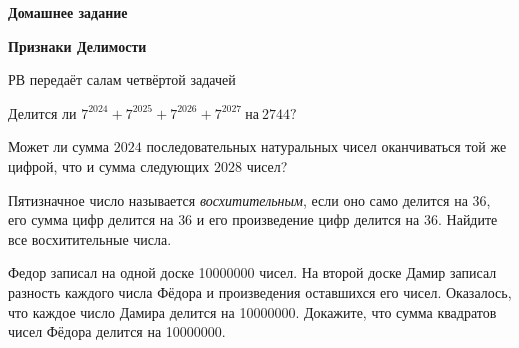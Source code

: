 \hspace{3mm}

\centerline{\bf \Huge Домашнее задание}
\centerline{\bf \Huge Признаки Делимости}

\begin{flushright}
    \scriptsize{РВ передаёт салам четвёртой задачей}
\end{flushright}

Делится ли $7^{2024} + 7^{2025} + 7^{2026} + 7^{2027} \ \text{на} \ 2744?$

Может ли сумма $2024$ последовательных натуральных чисел оканчиваться той же цифрой, что и сумма следующих $2028$ чисел?

Пятизначное число называется \textit{восхитительным}, если оно само делится на $36$, его сумма цифр делится на $36$ и его произведение цифр делится на $36$. Найдите все восхитительные числа.

Федор записал на одной доске 10000000 чисел. На второй доске Дамир записал разность каждого числа Фёдора и произведения оставшихся его чисел. Оказалось, что каждое число Дамира делится на 10000000. Докажите, что сумма квадратов чисел Фёдора делится на 10000000.